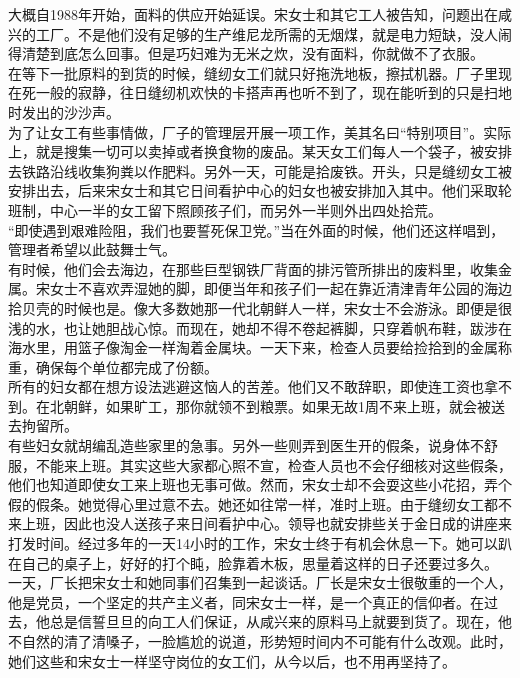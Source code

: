 \begin{multicols}{\theparacolNo}
大概自1988年开始，面料的供应开始延误。宋女士和其它工人被告知，问题出在咸兴的工厂。不是他们没有足够的生产维尼龙所需的无烟煤，就是电力短缺，没人闹得清楚到底怎么回事。但是巧妇难为无米之炊，没有面料，你就做不了衣服。\\

在等下一批原料的到货的时候，缝纫女工们就只好拖洗地板，擦拭机器。厂子里现在死一般的寂静，往日缝纫机欢快的卡搭声再也听不到了，现在能听到的只是扫地时发出的沙沙声。\\

为了让女工有些事情做，厂子的管理层开展一项工作，美其名曰“特别项目”。实际上，就是搜集一切可以卖掉或者换食物的废品。某天女工们每人一个袋子，被安排去铁路沿线收集狗粪以作肥料。另外一天，可能是拾废铁。开头，只是缝纫女工被安排出去，后来宋女士和其它日间看护中心的妇女也被安排加入其中。他们采取轮班制，中心一半的女工留下照顾孩子们，而另外一半则外出四处拾荒。\\

“即使遇到艰难险阻，我们也要誓死保卫党。”当在外面的时候，他们还这样唱到，管理者希望以此鼓舞士气。\\

有时候，他们会去海边，在那些巨型钢铁厂背面的排污管所排出的废料里，收集金属。宋女士不喜欢弄湿她的脚，即便当年和孩子们一起在靠近清津青年公园的海边拾贝壳的时候也是。像大多数她那一代北朝鲜人一样，宋女士不会游泳。即便是很浅的水，也让她胆战心惊。而现在，她却不得不卷起裤脚，只穿着帆布鞋，跋涉在海水里，用篮子像淘金一样淘着金属块。一天下来，检查人员要给捡拾到的金属称重，确保每个单位都完成了份额。\\

所有的妇女都在想方设法逃避这恼人的苦差。他们又不敢辞职，即使连工资也拿不到。在北朝鲜，如果旷工，那你就领不到粮票。如果无故1周不来上班，就会被送去拘留所。\\

有些妇女就胡编乱造些家里的急事。另外一些则弄到医生开的假条，说身体不舒服，不能来上班。其实这些大家都心照不宣，检查人员也不会仔细核对这些假条，他们也知道即使女工来上班也无事可做。然而，宋女士却不会耍这些小花招，弄个假的假条。她觉得心里过意不去。她还如往常一样，准时上班。由于缝纫女工都不来上班，因此也没人送孩子来日间看护中心。领导也就安排些关于金日成的讲座来打发时间。经过多年的一天14小时的工作，宋女士终于有机会休息一下。她可以趴在自己的桌子上，好好的打个盹，脸靠着木板，思量着这样的日子还要过多久。\\

一天，厂长把宋女士和她同事们召集到一起谈话。厂长是宋女士很敬重的一个人，他是党员，一个坚定的共产主义者，同宋女士一样，是一个真正的信仰者。在过去，他总是信誓旦旦的向工人们保证，从咸兴来的原料马上就要到货了。现在，他不自然的清了清嗓子，一脸尴尬的说道，形势短时间内不可能有什么改观。此时，她们这些和宋女士一样坚守岗位的女工们，从今以后，也不用再坚持了。\\


\end{multicols}
